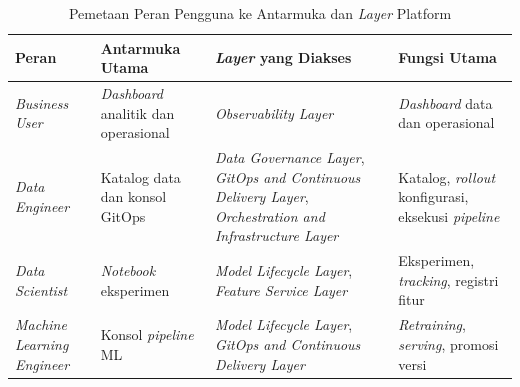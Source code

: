 \begin{table}[!htb]
\centering
\caption{Pemetaan Peran Pengguna ke Antarmuka dan \textit{Layer} Platform}
\label{tab:peran-akses}
\footnotesize
\setlength{\tabcolsep}{3pt}
\begin{tabular}{|>{\raggedright\arraybackslash}m{2.6cm}|>{\raggedright\arraybackslash}m{2.5cm}|>{\raggedright\arraybackslash}m{4.9cm}|>{\raggedright\arraybackslash}m{3.0cm}|}
\hline
\centering\arraybackslash\textbf{Peran} & \centering\arraybackslash\textbf{Antarmuka Utama} & \centering\arraybackslash\textbf{\textit{Layer} yang Diakses} & \centering\arraybackslash\textbf{Fungsi Utama} \\
\hline
\textit{Business User} & \textit{Dashboard} analitik dan operasional & \textit{Observability Layer} & \textit{Dashboard} data dan operasional \\
\hline
\textit{Data Engineer} & Katalog data dan konsol GitOps & \textit{Data Governance Layer}, \textit{GitOps and Continuous Delivery Layer}, \textit{Orchestration and Infrastructure Layer} & Katalog, \textit{rollout} konfigurasi, eksekusi \textit{pipeline} \\
\hline
\textit{Data Scientist} & \textit{Notebook} eksperimen & \textit{Model Lifecycle Layer}, \textit{Feature Service Layer} & Eksperimen, \textit{tracking}, registri fitur \\
\hline
\textit{Machine Learning Engineer} & Konsol \textit{pipeline} ML & \textit{Model Lifecycle Layer}, \textit{GitOps and Continuous Delivery Layer} & \textit{Retraining}, \textit{serving}, promosi versi \\
\hline
\end{tabular}
\end{table}
